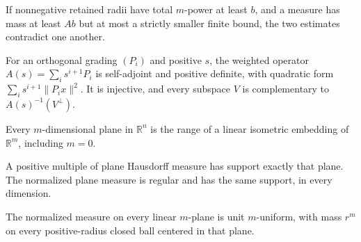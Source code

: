 \begin{lemma}
\label{lem:column-mass-contradiction}

If nonnegative retained radii have total $m$-power at least $b$, and a measure has mass at least $Ab$ but at most a strictly smaller finite bound, the two estimates contradict one another.
\end{lemma}

\begin{lemma}
\label{lem:weighted-grading-positive-complement}

For an orthogonal grading $(P_i)$ and positive $s$, the weighted operator $A(s)=\sum_i s^{i+1}P_i$ is self-adjoint and positive definite, with quadratic form $\sum_i s^{i+1}\|P_i x\|^2$. It is injective, and every subspace $V$ is complementary to $A(s)^{-1}(V^\perp)$.
\end{lemma}

\begin{lemma}
\label{lem:plane-isometric-parametrization}

Every $m$-dimensional plane in $\mathbb R^n$ is the range of a linear isometric embedding of $\mathbb R^m$, including $m=0$.
\end{lemma}

\begin{lemma}
\label{lem:unit-flat-support-regularity}

A positive multiple of plane Hausdorff measure has support exactly that plane. The normalized plane measure is regular and has the same support, in every dimension.
\end{lemma}

\begin{lemma}
\label{lem:unit-flat-unit-uniform}

The normalized measure on every linear $m$-plane is unit $m$-uniform, with mass $r^m$ on every positive-radius closed ball centered in that plane.
\end{lemma}


